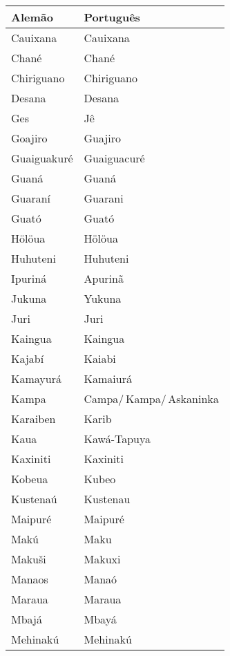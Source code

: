 \begin{center}
\begin{tabular}{ | m{11em} | m{4.2cm}| } 
\hline
\textbf{Alemão} & \textbf{Português} \\ [0.5ex] 
\hline\hline
Cauixana          	       	  & Cauixana \\
\hline
Chané             	       	  & Chané \\
\hline
Chiriguano        	       	  & Chiriguano \\
\hline
Desana            	       	  & Desana \\
\hline
Ges               	       	  & Jê \\
\hline
Goajiro           	       	  & Guajiro \\
\hline
Guaiguakuré       	       	  & Guaiguacuré \\
\hline
Guaná             	       	  & Guaná \\
\hline
Guaraní           	       	  & Guarani \\
\hline
Guató             	       	  & Guató \\
\hline
Hölöua            	       	  & Hölöua \\
\hline
Huhuteni          	       	& Huhuteni \\
\hline
Ipuriná           	       	& Apurinã \\
\hline
Jukuna            	       	& Yukuna \\
\hline
Juri              	       	& Juri \\
\hline
Kaingua           	       	& Kaingua \\
\hline
Kajabí            	       	& Kaiabi \\
\hline
Kamayurá          	       	& Kamaiurá \\
\hline
Kampa             	       	& Campa/\,Kampa/\,Askaninka \\
\hline
Karaiben          	       	& Karib \\
\hline
Kaua              	       	& Kawá-Tapuya \\
\hline
Kaxiniti          	       	& Kaxiniti \\
\hline
Kobeua            	       	& Kubeo \\
\hline
Kustenaú          	       	& Kustenau \\
\hline
Maipuré           	       	& Maipuré \\
\hline
Makú              	       	& Maku \\
\hline
Makuši            	       	& Makuxi \\
\hline
Manaos            	       	& Manaó \\
\hline
Maraua            	       	& Maraua \\
\hline
Mbajá             	       	& Mbayá \\
\hline
Mehinakú          	       	& Mehinakú \\
\hline
\end{tabular}
\end{center}


